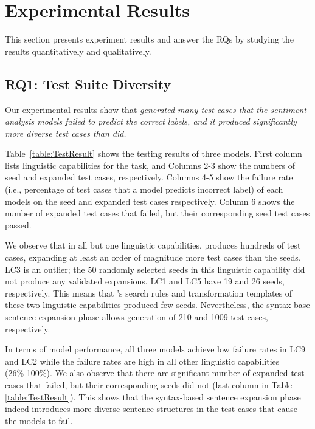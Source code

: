 \section{Experimental Results}
\label{sec:result}

This section presents experiment results and answer the RQs by
studying the results quantitatively and qualitatively.


\subsection{RQ1: Test Suite Diversity}

Our experimental results show that \emph{\tool generated many test cases that the sentiment analysis models failed to predict the correct labels, and it produced significantly more diverse test cases than \Cklst did.}

Table~\ref{table:TestResult} shows the testing results of three \sa models. First column lists 
linguistic capabilities for the \sa task, and Columns 2-3 show 
the numbers of seed and expanded test cases, respectively. 
Columns 4-5 show the failure rate (i.e., percentage of test cases that a model predicts incorrect label) of each \sa models on the seed and expanded test cases respectively. 
Column 6 shows the number of expanded test cases that failed,
but their corresponding seed test cases passed.

We observe that in all but one linguistic capabilities,
\tool produces hundreds of test cases, expanding at least an order of magnitude more test cases than the seeds.
LC3 is an outlier; the 50 randomly selected
seeds in this linguistic capability did not produce any validated
expansions.
LC1 and LC5 have 19 and 26 seeds,
respectively. This means that \tool's search rules and transformation templates of these two linguistic capabilities produced few seeds.
Nevertheless, the syntax-base sentence expansion phase allows generation of 210 and 1009 test cases, respectively.

In terms of \sa model performance, all
three models achieve low failure rates in LC9 and LC2 while the failure rates are high in all other linguistic capabilities (26\%-100\%). We also observe that there are significant number of expanded test cases that failed, but their corresponding seeds did not (last column in Table \ref{table:TestResult}). This shows that the syntax-based sentence expansion phase indeed introduces more diverse sentence structures in the test cases that cause the models to fail.

